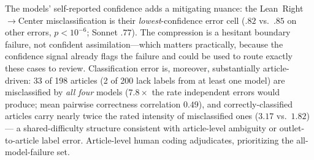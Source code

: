 \documentclass{article}
\begin{document}
The models' self-reported confidence adds a mitigating nuance: the
Lean~Right$\to$Center misclassification is their \emph{lowest}-confidence
error cell ($.82$ vs.\ $.85$ on other errors, $p<10^{-6}$; Sonnet
$.77$). The compression is a hesitant boundary failure, not confident
assimilation---which matters practically, because the
confidence signal already flags the failure and could be used to route
exactly these cases to review. Classification error is, moreover, substantially article-driven: 33 of
198 articles (2 of 200 lack labels from at least one model) are
misclassified by \emph{all four} models ($7.8\times$
the rate independent errors would produce; mean pairwise correctness
correlation $0.49$), and correctly-classified articles carry nearly
twice the rated intensity of misclassified ones ($3.17$ vs.\ $1.82$)
--- a shared-difficulty structure consistent with article-level
ambiguity or outlet-to-article label error. Article-level human coding
adjudicates, prioritizing the all-model-failure set.
\end{document}

